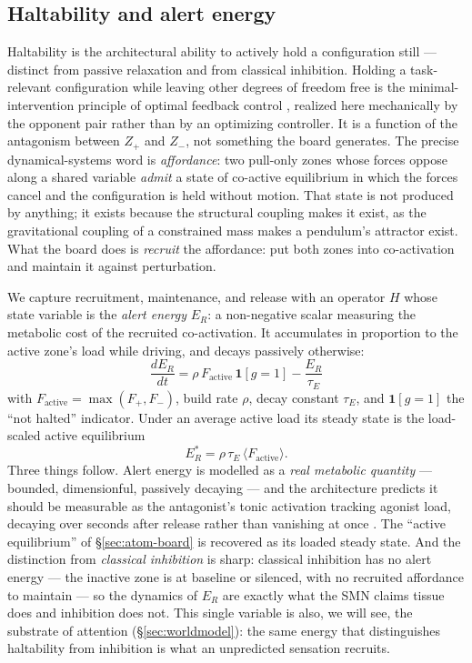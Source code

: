 \documentclass{article}
\begin{document}
\subsection{Haltability and alert energy}\label{sec:atom-halt}

Haltability is the architectural ability to actively hold a
configuration still --- distinct from passive relaxation and from
classical inhibition.  Holding a task-relevant configuration while leaving
other degrees of freedom free is the minimal-intervention principle of optimal
feedback control \citep{TodorovJordan2002OFC}, realized here mechanically by
the opponent pair rather than by an optimizing controller.  It is a function of
the antagonism between $Z_+$
and $Z_-$, not something the board generates.  The precise
dynamical-systems word is \emph{affordance}: two pull-only zones whose
forces oppose along a shared variable \emph{admit} a state of co-active
equilibrium in which the forces cancel and the configuration is held
without motion.  That state is not produced by anything; it exists
because the structural coupling makes it exist, as the gravitational
coupling of a constrained mass makes a pendulum's attractor exist.
What the board does is \emph{recruit} the affordance: put both zones
into co-activation and maintain it against perturbation.

We capture recruitment, maintenance, and release with an operator $H$
whose state variable is the \emph{alert energy} $E_R$: a non-negative
scalar measuring the metabolic cost of the recruited co-activation.
It accumulates in proportion to the active zone's load while driving,
and decays passively otherwise:
\begin{equation}
\boxed{\;\frac{dE_R}{dt} = \rho\,F_{\text{active}}\,\mathbf{1}[g=1]
              - \frac{E_R}{\tau_E}\;}
\label{eq:alertenergy}
\end{equation}
with $F_{\text{active}} = \max(F_+, F_-)$, build rate $\rho$, decay
constant $\tau_E$, and $\mathbf{1}[g=1]$ the ``not halted'' indicator.
Under an average active load its steady state is the load-scaled active
equilibrium
\begin{equation}
E_R^* = \rho\,\tau_E\,\langle F_{\text{active}}\rangle .
\label{eq:Estar}
\end{equation}
Three things follow.  Alert energy is modelled as a \emph{real metabolic quantity}
--- bounded, dimensionful, passively decaying --- and the architecture
predicts it should be measurable as the antagonist's tonic activation
tracking agonist load, decaying over seconds after release rather than
vanishing at once
\citep{Feldman1986_EquilibriumPoint,Latash2008EquilibriumPointHistory}.
The ``active equilibrium'' of \S\ref{sec:atom-board} is recovered as
its loaded steady state.  And the distinction from \emph{classical
inhibition} is sharp: classical inhibition has no alert energy --- the
inactive zone is at baseline or silenced, with no recruited affordance
to maintain --- so the dynamics of $E_R$ are exactly what the SMN
claims tissue does and inhibition does not.  This single variable is
also, we will see, the substrate of attention (\S\ref{sec:worldmodel}):
the same energy that distinguishes haltability from inhibition is what
an unpredicted sensation recruits.
\end{document}
